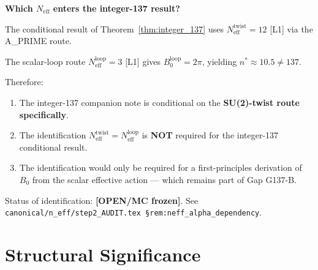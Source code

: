 \documentclass[12pt,a4paper]{article}
\theoremstyle{definition}
\theoremstyle{remark}
\begin{document}
\begin{resultbox}
\textbf{Which $N_{\mathrm{eff}}$ enters the integer-137 result?}

The conditional result of Theorem~\ref{thm:integer_137} uses
$N_{\mathrm{eff}}^{\mathrm{twist}} = 12$ [L1] via the A\_PRIME route.

The scalar-loop route $N_{\mathrm{eff}}^{\mathrm{loop}} = 3$ [L1] gives
$B_0^{\mathrm{loop}} = 2\pi$, yielding $n^* \approx 10.5 \neq 137$.

Therefore:
\begin{enumerate}
\item The integer-137 companion note is conditional on the
  \textbf{SU(2)-twist route specifically}.
\item The identification $N_{\mathrm{eff}}^{\mathrm{twist}} = N_{\mathrm{eff}}^{\mathrm{loop}}$
  is \textbf{NOT} required for the integer-137 conditional result.
\item The identification would only be required for a first-principles derivation
  of $B_0$ from the scalar effective action — which remains part of Gap G137-B.
\end{enumerate}
Status of identification: \textbf{[OPEN/MC frozen]}.  See
\texttt{canonical/n\_eff/step2\_AUDIT.tex §rem:neff\_alpha\_dependency}.
\end{resultbox}

\section{Structural Significance}
\label{sec:structure}
\end{document}
